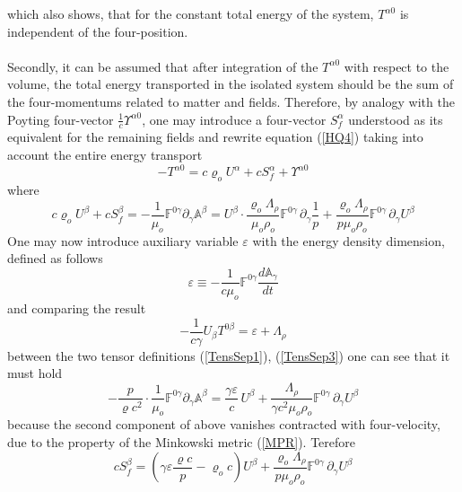 \documentclass[aps,prx,preprint,groupedaddress,showkeys]{revtex4-2}
\newcommand{\mdt}[1] {\frac{d {#1}}{dt}}
\begin{document}
which also shows, that for the constant total energy of the system, $T^{\alpha 0}$ is independent of the four-position.\\
~\\
Secondly, it can be assumed that after integration of the $T^{\alpha 0}$ with respect to the volume, the total energy transported in the isolated system should be the sum of the four-momentums related to matter and fields. Therefore, by analogy with the Poyting four-vector $\frac{1}{c}\Upsilon^{\alpha 0}$, one may introduce a four-vector $S_f^{\alpha}$ understood as its equivalent for the remaining fields and rewrite equation (\ref{HQ4}) taking into account the entire energy transport
\begin{equation} \label{HQ4b}
- T^{\alpha 0} =  c\varrho_o U^{\alpha} + cS_f^{\alpha} + \Upsilon^{\alpha 0}
\end{equation}
where
\begin{equation} \label{HQ4c}
c\varrho_o U^{\beta} + cS_f^{\beta} = - \frac{1}{\mu_o} \mathbb{F}^{0 \gamma} \partial_{\gamma} \mathbb{A}^{\beta} = U^{\beta} \cdot \frac{\varrho_o \Lambda_{\rho}}{ \mu_o \rho_o} \mathbb{F}^{0 \gamma} \, \partial_{\gamma} \frac{1}{p} +   \frac{\varrho_o \Lambda_{\rho}}{p \mu_o \rho_o} \mathbb{F}^{0 \gamma} \, \partial_{\gamma} U^{\beta}
\end{equation}
One may now introduce auxiliary variable $\varepsilon$ with the energy density dimension, defined as follows
\begin{equation} \label{EpsDef}
\varepsilon \equiv - \frac{1}{c \mu_o} \mathbb{F}^{0 \gamma} \mdt {\mathbb{A}_{\gamma}}
\end{equation}
and comparing the result
\begin{equation} \label{Lagr}
-\frac{1}{c\gamma} U_{\beta}T^{0 \beta} = \varepsilon + \Lambda_{\rho}
\end{equation}
between the two tensor definitions (\ref{TensSep1}), (\ref{TensSep3}) one can see that it must hold
\begin{equation} \label{EpsProp}
- \frac{p}{\varrho c^2} \cdot \frac{1}{\mu_o} \mathbb{F}^{0 \gamma} \partial_{\gamma} \mathbb{A}^{\beta} = \frac{\gamma \varepsilon}{c} \, U^{\beta} +  \frac{\Lambda_{\rho}}{\gamma c^2 \mu_o \rho_o} \mathbb{F}^{0 \gamma} \, \partial_{\gamma} U^{\beta}
\end{equation}
because the second component of above vanishes contracted with four-velocity, due to the property of the Minkowski metric (\ref{MPR}). Terefore
\begin{equation} \label{HQ4d}
cS_f^{\beta} = \left ( \gamma \varepsilon \frac{\varrho c}{p} - \varrho_o c \right )  U^{\beta} + \frac{\varrho_o \Lambda_{\rho}}{p \mu_o \rho_o} \mathbb{F}^{0 \gamma} \, \partial_{\gamma} U^{\beta}
\end{equation}
\end{document}
